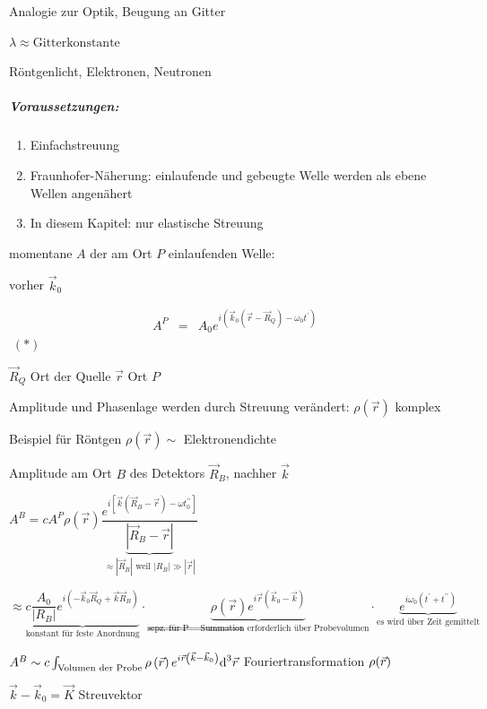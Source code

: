 Analogie zur Optik, Beugung an Gitter

$\lambda\approx\text{Gitterkonstante}$

R\"ontgenlicht, Elektronen, Neutronen


\subparagraph{Voraussetzungen:}
\begin{enumerate}
\item Einfachstreuung 
\item Fraunhofer-N\"aherung: einlaufende und gebeugte Welle werden als ebene
Wellen angen\"ahert
\item In diesem Kapitel: nur elastische Streuung
\end{enumerate}
momentane $A$ der am Ort $P$ einlaufenden Welle:

vorher $\vec{k}_{0}$

\begin{eqnarray}
A^{P} & = & A_{0}e^{i\left(\vec{k}_{0}\left(\vec{r}-\vec{R}_{Q}\right)-\omega_{0}t^{\prime}\right)}\label{eq:beugungswelle}\end{eqnarray}
 $\;(*)$ 

$\vec{R}_{Q}$ Ort der Quelle $\vec{r}$ Ort $P$ 

Amplitude und Phasenlage werden durch Streuung ver\"andert: $\rho\left(\vec{r}\right)$
komplex 

Beispiel f\"ur R\"ontgen $\rho\left(\vec{r}\right)\sim$ Elektronendichte

Amplitude am Ort $B$ des Detektors $\vec{R}_{B}$, nachher $\vec{k}$ 

$A^{B}=cA^{P}\rho\left(\vec{r}\right)\dfrac{e^{i\left[\vec{k}\left(\vec{R}_{B}-\vec{r}\right)-\omega t_{0}^{\prime\prime}\right]}}{\underbrace{\left|\vec{R}_{B}-\vec{r}\right|}_{\approx\left|\vec{R}_{B}\right|\text{ weil }\left|R_{B}\right|\gg\left|\vec{r}\right|}}$ 

$\approx\underbrace{c\dfrac{A_{0}}{\left|R_{B}\right|}e^{i\left(-\vec{k}_{0}\vec{R}_{Q}+\vec{k}\vec{R}_{B}\right)}}_{\text{konstant f\"ur feste Anordnung}}\cdot\underbrace{\rho\left(\vec{r}\right)e^{i\vec{r}\left(\vec{k}_{0}-\vec{k}\right)}}_{\text{sepz. f\"ur P }\Rightarrow\text{Summation erforderlich \"uber Probevolumen}}\cdot\underbrace{e^{i\omega_{0}\left(t^{\prime}+t^{\prime\prime}\right)}}_{\text{es wird \"uber Zeit gemittelt}}$ 

$A^{B}\sim c\intop_{\text{Volumen der Probe}}\rho\left(\vec{r}\right)e^{i\vec{r}\left(\vec{k}-\vec{k}_{0}\right)}\text{d}^{3}\vec{r}$
Fouriertransformation $\rho\mbox{\ensuremath{\left(\vec{r}\right)} }$ 

$\vec{k}-\vec{k}_{0}=\vec{K}$ Streuvektor

